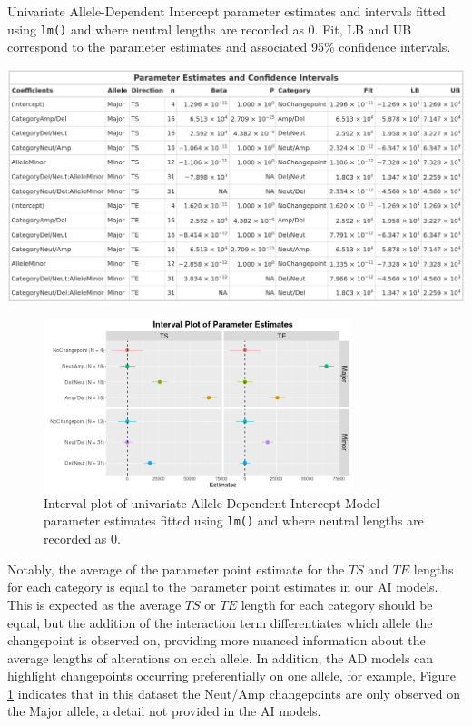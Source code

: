 \begin{table}[H]
\centering
\caption[Univariate Allele-Dependent Intercept Model parameter estimates and intervals fitted using \texttt{lm()}.]{Univariate Allele-Dependent Intercept parameter estimates and intervals fitted using \texttt{lm()} and where neutral lengths are recorded as 0. Fit, LB and UB correspond to the parameter estimates and associated 95\% confidence intervals. }
      
\includegraphics[width = 1\textwidth]{../tables/Chapter_5/Univariate_lm_7_AD_Model_Pred.png}
\label{tab:lm_uni_AD_modpred}
\end{table}

\begin{figure}[H] 
\centering
\includegraphics[width = 0.8\textwidth]{../figures/Chapter_5/Univariate_lm_7_AD_Interval.png}
 
\caption[Interval plot of univariate Allele-Dependent Intercept Model parameter estimates fitted using \texttt{lm()}.]{Interval plot of univariate Allele-Dependent Intercept Model parameter estimates fitted using \texttt{lm()} and where neutral lengths are recorded as 0.}
\label{fig:lm_uni_AD_modpred}
\end{figure}

Notably, the average of the parameter point estimate for the $TS$ and $TE$ lengths for each category is equal to the parameter point estimates in our AI models. This is expected as the average $TS$ or $TE$ length for each category should be equal, but the addition of the interaction term differentiates which allele the changepoint is observed on, providing more nuanced information about the average lengths of alterations on each allele. In addition, the AD models can highlight changepoints occurring preferentially on one allele, for example, Figure \ref{fig:lm_uni_AD_modpred} indicates that in this dataset the Neut/Amp changepoints are only observed on the Major allele, a detail not provided in the AI models. 

